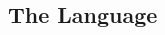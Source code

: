 \subsection{The Language}

\begin{definition}
  \hfill
  \begin{multicols}{2}
    \ottgrammartabular{
      \ottiN\ottinterrule
    }

    \ottgrammartabular{
      \ottiP\ottinterrule
    }
    \columnbreak
  \end{multicols}
\end{definition}